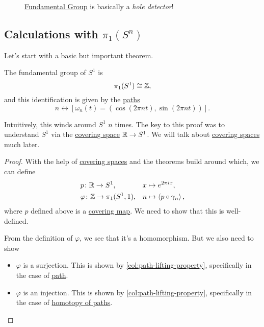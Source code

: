 \begin{figure}[H]
	\centering
	\caption{\hyperref[def:fundamental-group]{Fundamental Group} is basically a \emph{hole detector}!}
	\label{fig:fundamental-group-hole-detector}
\end{figure}

\subsection{Calculations with \(\pi _1(S^n)\)}
Let's start with a basic but important theorem.
\begin{theorem}
	The fundamental group of \(S^1\) is
	\[
		\pi _1(S^1)\cong \mathbb{\MakeUppercase{z}},
	\]
	and this identification is given by the \hyperref[def:path]{paths}
	\[
		n \leftrightarrow [\omega_{n}(t) = (\cos (2\pi nt), \sin (2\pi nt))].
	\]
\end{theorem}
\begin{remark}
	Intuitively, this winds around \(S^1\) \(n\) times. The key to this proof was to understand \(S^1\) via the \hyperref[def:covering-space]{covering space}
	\(\mathbb{\MakeUppercase{r}} \to S^1\). We will talk about \hyperref[def:covering-space]{covering spaces} much later.
\end{remark}
\begin{proof}
	With the help of \hyperref[def:covering-space]{covering spaces} and the theorems build around which, we can define
	\[
		\begin{alignedat}{3}
			&p \colon \mathbb{\MakeUppercase{r}} \to S^1, &&x\mapsto e^{2 \pi  i x},\\
			&\varphi \colon \mathbb{\MakeUppercase{z}} \to \pi _1(S^1, 1),\quad &&n\mapsto \left< p\circ \gamma _n \right>,
		\end{alignedat}
	\]
	where \(p\) defined above is a \hyperref[def:covering-map]{covering map}. We need to show that this is well-defined.

	From the definition of \(\varphi \), we see that it's a homomorphism. But we also need to show
	\begin{itemize}
		\item \(\varphi \) is a surjection. This is shown by \autoref{col:path-lifting-property}, specifically in the case of \hyperref[def:path]{path}.
		\item \(\varphi \) is an injection. This is shown by \autoref{col:path-lifting-property}, specifically in the case of \hyperref[def:homotopy-path]{homotopy of paths}.
	\end{itemize}
\end{proof}

